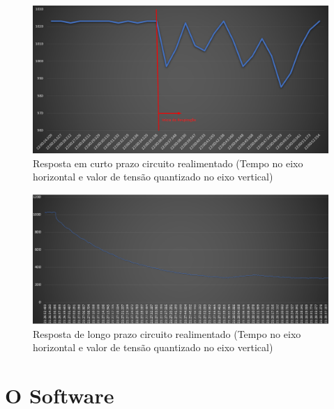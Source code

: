 \begin{figure}[h!]
	\begin{center}
		\includegraphics[width=1\linewidth]{images/RespostaCircuitoRealimentado.png}
		\caption{Resposta em curto prazo circuito realimentado (Tempo no eixo horizontal e valor de tensão quantizado no eixo vertical)}
		\label{fig:RespostaCircuitoRealimentado}
	\end{center}
\end{figure}

\begin{figure}[h!]
	\begin{center}
		\includegraphics[width=1\linewidth]{images/DecaimentoRespiracaoMascara.png}
		\caption{Resposta de longo prazo circuito realimentado (Tempo no eixo horizontal e valor de tensão quantizado no eixo vertical)}
		\label{fig:RespostaCircuitoRealimentadoLongoPrazo}
	\end{center}
\end{figure}
\FloatBarrier

 
 
\section{O Software}

